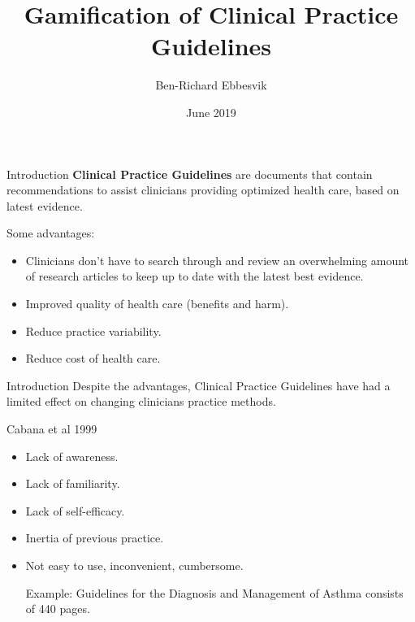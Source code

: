 \documentclass{beamer}
\begin{document}
\title{Gamification of Clinical Practice Guidelines}
\author{Ben-Richard Ebbesvik}
\date{June 2019}
\subject{Master thesis}
\frame{\titlepage}


\begin{frame}{Introduction}
\textbf{Clinical Practice Guidelines} are documents that contain recommendations to assist clinicians providing optimized health care, based on latest evidence. 

Some advantages:
\begin{itemize}
	\item Clinicians don't have to search through and review an overwhelming amount of research articles to keep up to date with the latest best evidence.
	\item Improved quality of health care (benefits and harm).
	\item Reduce practice variability.
	\item Reduce cost of health care.
\end{itemize}	
\end{frame}

\begin{frame}{Introduction}
Despite the advantages, Clinical Practice Guidelines have had a limited effect on changing clinicians practice methods.
\begin{block}{Cabana et al 1999}
\begin{itemize}
	\item Lack of awareness.
	\item Lack of familiarity.
	\item  Lack of self-efficacy.
	\item Inertia of previous practice.
	\item Not easy to use, inconvenient, cumbersome.

Example: Guidelines for the Diagnosis and Management of Asthma consists of 440 pages.
\end{itemize}
\end{block}
\end{frame}
\end{document}
